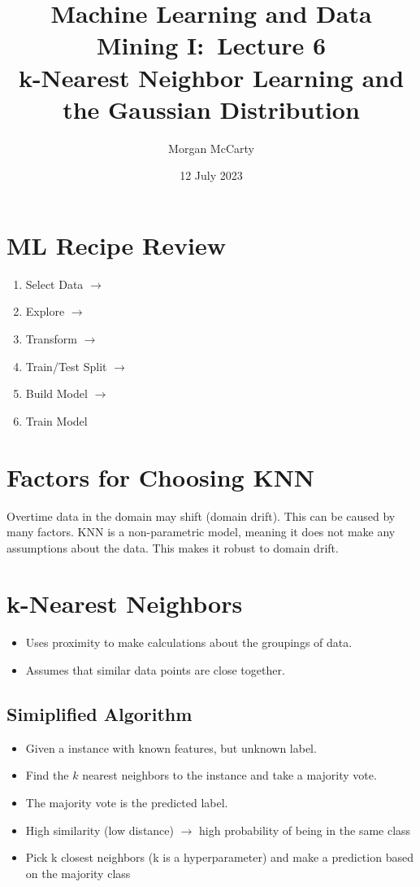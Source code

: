 \documentclass[12pt]{article}
\title{
    Machine Learning and Data Mining I:\ Lecture 6\\
    k-Nearest Neighbor Learning and the Gaussian Distribution}
\author{Morgan McCarty}
\date{12 July 2023}
\begin{document}
    \maketitle

    \section{ML Recipe Review}
        \begin{enumerate}
            \item Select Data $\rightarrow$
            \item Explore $\rightarrow$
            \item Transform $\rightarrow$
            \item Train/Test Split $\rightarrow$
            \item Build Model $\rightarrow$
            \item Train Model
        \end{enumerate}
    \section{Factors for Choosing KNN}
        Overtime data in the domain may shift (domain drift). This can be caused by many factors.
        KNN is a non-parametric model, meaning it does not make any assumptions about the data. This makes it robust to domain drift.
    \section{k-Nearest Neighbors}
        \begin{itemize}
            \item Uses proximity to make calculations about the groupings of data.
            \item Assumes that similar data points are close together.
        \end{itemize}
        \subsection{Simiplified Algorithm}
            \begin{itemize}
                \item Given a instance with known features, but unknown label.
                \item Find the $k$ nearest neighbors to the instance and take a majority vote.
                \item The majority vote is the predicted label. 
                \item High similarity (low distance) $\rightarrow$ high probability of being in the same class
                \item Pick k closest neighbors (k is a hyperparameter) and make a prediction based on the majority class
            \end{itemize}
\end{document}
